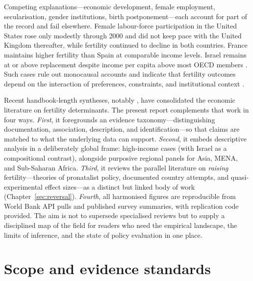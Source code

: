 \documentclass[11pt,a4paper,openany]{book}
\begin{document}
Competing explanations---economic development, female employment, secularisation, gender institutions, birth postponement---each account for part of the record and fail elsewhere. Female labour-force participation in the United States rose only modestly through 2000 and did not keep pace with the United Kingdom thereafter, while fertility continued to decline in both countries. France maintains higher fertility than Spain at comparable income levels. Israel remains at or above replacement despite income per capita above most OECD members \citep{okun2013}. Such cases rule out monocausal accounts and indicate that fertility outcomes depend on the interaction of preferences, constraints, and institutional context \citep{sobotka2017,doepke2023,kohler2001}.

Recent handbook-length syntheses, notably \citet{doepke2023}, have consolidated the economic literature on fertility determinants. The present report complements that work in four ways. \emph{First}, it foregrounds an evidence taxonomy---distinguishing documentation, association, description, and identification---so that claims are matched to what the underlying data can support. \emph{Second}, it embeds descriptive analysis in a deliberately global frame: high-income cases (with Israel as a compositional contrast), alongside purposive regional panels for Asia, MENA, and Sub-Saharan Africa. \emph{Third}, it reviews the parallel literature on \emph{raising} fertility---theories of pronatalist policy, documented country attempts, and quasi-experimental effect sizes---as a distinct but linked body of work (Chapter~\ref{sec:reversal}). \emph{Fourth}, all harmonised figures are reproducible from World Bank API pulls and published survey summaries, with replication code provided. The aim is not to supersede specialised reviews but to supply a disciplined map of the field for readers who need the empirical landscape, the limits of inference, and the state of policy evaluation in one place.

\section{Scope and evidence standards}
\end{document}
